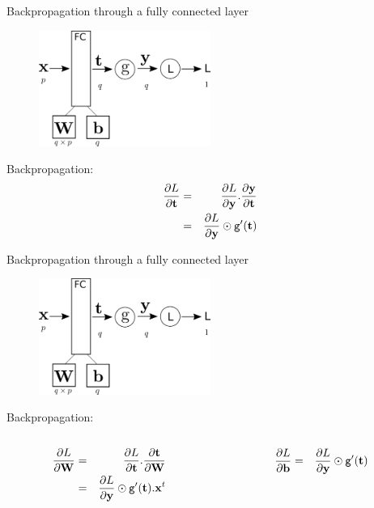\documentclass[xcolor=pdftex,dvipsnames,table,mathserif]{beamer}
\begin{document}
\begin{frame}{Backpropagation through a fully connected layer}
  \begin{figure}
    \includegraphics[width=0.5\textwidth]{bp_fc.png}
  \end{figure}

  Backpropagation:
  \begin{eqnarray*}
    \pdv{L}{\mathbf{t}} &=& \pdv{L}{\mathbf{y}}.\pdv{\mathbf{y}}{\mathbf{t}} \\
    &=& \pdv{L}{\mathbf{y}} \odot \texttt{g}'(\mathbf{t}) \\
  \end{eqnarray*}

\end{frame}

\begin{frame}{Backpropagation through a fully connected layer}
  \begin{figure}
    \includegraphics[width=0.5\textwidth]{bp_fc.png}
  \end{figure}

  Backpropagation:
  \begin{columns}
    \begin{column}{.5\textwidth}
      \begin{eqnarray*}
        \pdv{L}{\mathbf{W}} &=& \pdv{L}{\mathbf{t}}.\pdv{\mathbf{t}}{\mathbf{W}} \\
        &=& \pdv{L}{\mathbf{y}} \odot \texttt{g}'(\mathbf{t}).\mathbf{x}^t
      \end{eqnarray*}
    \end{column}

    \begin{column}{.5\textwidth}
      \begin{eqnarray*}
        \pdv{L}{\mathbf{b}} &=&  \pdv{L}{\mathbf{y}} \odot \texttt{g}'(\mathbf{t})
      \end{eqnarray*}
    \end{column}
  \end{columns}


\end{frame}
\end{document}
